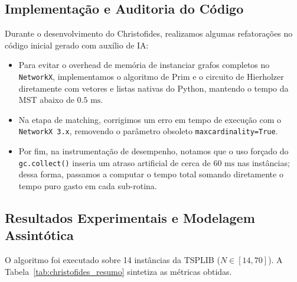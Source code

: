 \documentclass[12pt]{article}
\begin{document}
\subsection{Implementação e Auditoria do Código} 

Durante o desenvolvimento do Christofides, realizamos algumas refatorações no código inicial gerado com auxílio de IA:

\begin{itemize}
    \item Para evitar o overhead de memória de instanciar grafos completos no \texttt{NetworkX}, implementamos o algoritmo de Prim e o circuito de Hierholzer diretamente com vetores e listas nativas do Python, mantendo o tempo da MST abaixo de $0.5\text{ ms}$.
    \item Na etapa de matching, corrigimos um erro em tempo de execução com o \texttt{NetworkX 3.x}, removendo o parâmetro obsoleto \texttt{maxcardinality=True}.
    \item Por fim, na instrumentação de desempenho, notamos que o uso forçado do \texttt{gc.collect()} inseria um atraso artificial de cerca de $60\text{ ms}$ nas instâncias; dessa forma, passamos a computar o tempo total somando diretamente o tempo puro gasto em cada sub-rotina.
\end{itemize} 

\subsection{Resultados Experimentais e Modelagem Assintótica}

O algoritmo foi executado sobre 14 instâncias da TSPLIB ($N \in [14, 70]$). A Tabela~\ref{tab:christofides_resumo} sintetiza as métricas obtidas.
\end{document}
